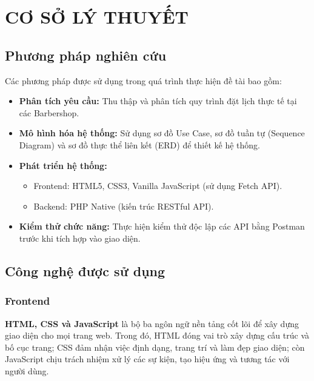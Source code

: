 \chapter{CƠ SỞ LÝ THUYẾT}

\section{Phương pháp nghiên cứu}
Các phương pháp được sử dụng trong quá trình thực hiện đề tài bao gồm:

\begin{itemize}
\item
	\textbf{Phân tích yêu cầu:} Thu thập và phân tích quy trình đặt lịch
	thực tế tại các Barbershop.
\item
	\textbf{Mô hình hóa hệ thống:} Sử dụng sơ đồ Use Case, sơ đồ tuần tự
	(Sequence Diagram) và sơ đồ thực thể liên kết (ERD) để thiết kế hệ
	thống.
\item
	\textbf{Phát triển hệ thống:}

	\begin{itemize}
	\item
		Frontend: HTML5, CSS3, Vanilla JavaScript (sử dụng Fetch API).
	\item
		Backend: PHP Native (kiến trúc RESTful API).
	\end{itemize}
\item
	\textbf{Kiểm thử chức năng:} Thực hiện kiểm thử độc lập các API bằng
	Postman trước khi tích hợp vào giao diện.
\end{itemize}

\section{Công nghệ được sử dụng}
\subsection{Frontend}
\textbf{HTML, CSS và JavaScript} là bộ ba ngôn ngữ nền tảng cốt lõi để
xây dựng giao diện cho mọi trang web. Trong đó, HTML đóng vai trò xây
dựng cấu trúc và bố cục trang; CSS đảm nhận việc định dạng, trang trí
và làm đẹp giao diện; còn JavaScript chịu trách nhiệm xử lý các sự kiện,
tạo hiệu ứng và tương tác với người dùng.


